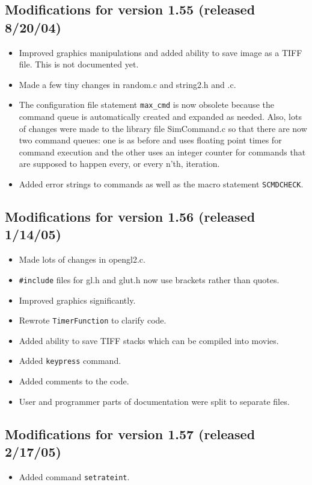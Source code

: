 \documentclass {scrbook}
\newcommand {\ttt} {\texttt}
\begin{document}
\subsection{Modifications for version 1.55 (released 8/20/04)}
\begin{itemize}
\item Improved graphics manipulations and added ability to save image as a TIFF file. This is not documented yet.
\item Made a few tiny changes in random.c and string2.h and .c.
\item The configuration file statement \ttt{max\_cmd} is now obsolete because the command queue is automatically created and expanded as needed. Also, lots of changes were made to the library file SimCommand.c so that there are now two command queues: one is as before and uses floating point times for command execution and the other uses an integer counter for commands that are supposed to happen every, or every n'th, iteration.
\item Added error strings to commands as well as the macro statement \ttt{SCMDCHECK}.
\end{itemize}

\subsection{Modifications for version 1.56 (released 1/14/05)}
\begin{itemize}
\item Made lots of changes in opengl2.c.
\item \ttt{\#include} files for gl.h and glut.h now use brackets rather than quotes.
\item Improved graphics significantly.
\item Rewrote \ttt{TimerFunction} to clarify code.
\item Added ability to save TIFF stacks which can be compiled into movies.
\item Added \ttt{keypress} command.
\item Added comments to the code.
\item User and programmer parts of documentation were split to separate files.
\end{itemize}

\subsection{Modifications for version 1.57 (released 2/17/05)}
\begin{itemize}
\item Added command \ttt{setrateint}.
\end{itemize}
\end{document}
